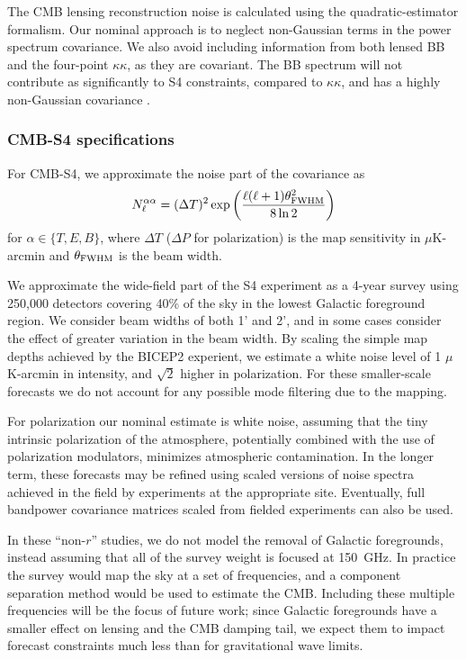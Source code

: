 The CMB lensing reconstruction noise is calculated using the \cite{Hu:2001kj} quadratic-estimator formalism. Our nominal approach is to neglect non-Gaussian terms in the power spectrum covariance. We also avoid including information from both lensed BB and the four-point $\kappa \kappa$, as they are covariant. The BB spectrum will not contribute as significantly to S4 constraints, compared to $\kappa \kappa$, and has a highly non-Gaussian covariance \cite{BenoitLevy:2012va}. 

\subsubsection{CMB-S4 specifications}
For CMB-S4, we approximate the noise part of the covariance as
%
\begin{equation}
N^{\alpha \alpha}_\ell = (\Delta T)^2 \exp \left( \frac{\ell(\ell + 1) \theta^2_{\rm FWHM}}{8 \ln 2} \right)
\end{equation}
%
for $\alpha \in \{T, E, B\}$, where $\Delta T$ ($\Delta P$ for polarization) is the map sensitivity in $\mu$K-arcmin and $\theta_{\rm FWHM}$ is the beam width. 

We approximate the wide-field part of the S4 experiment as a 4-year survey using 250,000 detectors covering 40\% of the sky in the lowest Galactic foreground region. We consider beam widths of both 1' and 2', and in some cases consider the effect of greater variation in the beam width. By scaling the simple map depths achieved by the BICEP2 experient, we estimate a white noise level of 1 $\mu$K-arcmin in intensity, and $\sqrt{2}$ higher in polarization. For these smaller-scale forecasts we do not account for any possible mode filtering due to the mapping.

For polarization our nominal estimate is white noise, assuming that the tiny intrinsic polarization of the atmosphere, potentially combined with the use of polarization modulators, minimizes atmospheric contamination. In the longer term, these forecasts may be refined using scaled versions of noise spectra achieved in the field by experiments at the appropriate site. Eventually, full bandpower covariance matrices scaled from fielded experiments can also be used.

In these ``non-$r$'' studies, we do not model the removal of Galactic foregrounds, instead assuming that all of the survey weight is focused at 150~GHz. In practice the survey would map the sky at a set of frequencies, and a component separation method would be used to estimate the CMB. Including these multiple frequencies will be the focus of future work; since Galactic foregrounds have a smaller effect on lensing and the CMB damping tail, we expect them to impact forecast constraints much less than for gravitational wave limits.

